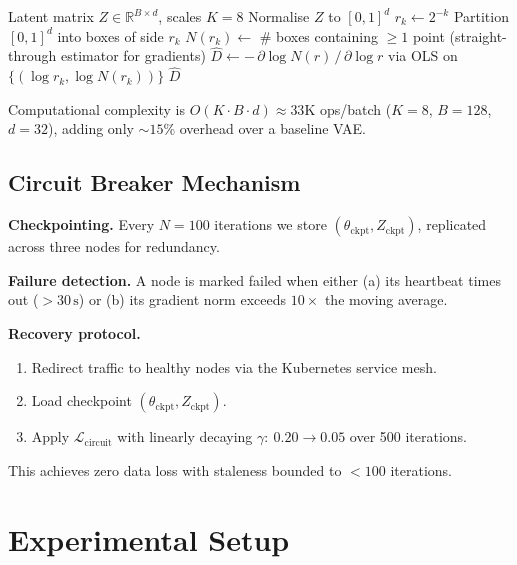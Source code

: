 \documentclass{article}
\begin{document}
\begin{algorithm}[t]
\caption{Differentiable BCD Estimation}
\label{alg:bcd}
\begin{algorithmic}[1]
  \REQUIRE Latent matrix $Z \in \mathbb{R}^{B \times d}$,
           scales $K=8$
  \STATE Normalise $Z$ to $[0,1]^{d}$
    \STATE $r_k \leftarrow 2^{-k}$
    \STATE Partition $[0,1]^{d}$ into boxes of side $r_k$
    \STATE $N(r_k) \leftarrow$ \# boxes containing $\geq 1$ point
           (straight-through estimator for gradients)
  \ENDFOR
  \STATE $\hat{D} \leftarrow -\,\partial\log N(r)\,/\,\partial\log r$
         via OLS on $\{(\log r_k, \log N(r_k))\}$
  \RETURN $\hat{D}$
\end{algorithmic}
\end{algorithm}

Computational complexity is $O(K \cdot B \cdot d) \approx 33\text{K}$
ops/batch ($K{=}8$, $B{=}128$, $d{=}32$), adding only ${\sim}15\%$
overhead over a baseline VAE.

\subsection{Circuit Breaker Mechanism}

\textbf{Checkpointing.}
Every $N{=}100$ iterations we store $(\theta_{\mathrm{ckpt}},
Z_{\mathrm{ckpt}})$, replicated across three nodes for redundancy.

\textbf{Failure detection.}
A node is marked failed when either (a) its heartbeat times out
($>30\,\mathrm{s}$) or (b) its gradient norm exceeds $10\times$ the
moving average.

\textbf{Recovery protocol.}
\begin{enumerate}[noitemsep]
  \item Redirect traffic to healthy nodes via the Kubernetes service mesh.
  \item Load checkpoint $(\theta_{\mathrm{ckpt}}, Z_{\mathrm{ckpt}})$.
  \item Apply $\mathcal{L}_{\mathrm{circuit}}$ with linearly decaying
        $\gamma{:}\ 0.20 \to 0.05$ over 500 iterations.
\end{enumerate}
This achieves zero data loss with staleness bounded to $<100$ iterations.

\section{Experimental Setup}
\label{sec:setup}
\end{document}
